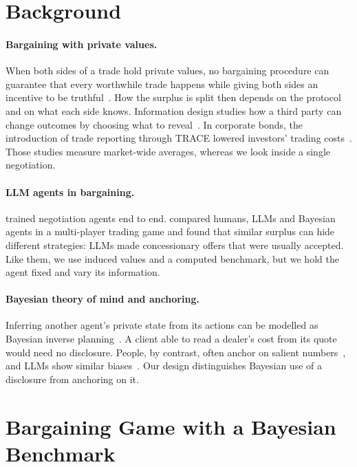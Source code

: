 \documentclass[sigconf]{acmart}
\begin{document}
\section{Background}

\paragraph{Bargaining with private values.}
When both sides of a trade hold private values, no bargaining procedure can guarantee that every worthwhile trade happens while giving both sides an incentive to be truthful~\cite{myerson1983efficient}. How the surplus is split then depends on the protocol and on what each side knows. Information design studies how a third party can change outcomes by choosing what to reveal~\cite{kamenica2011bayesian}. In corporate bonds, the introduction of trade reporting through TRACE lowered investors' trading costs~\cite{bessembinder2006market,edwards2007corporate}. Those studies measure market-wide averages, whereas we look inside a single negotiation.

\paragraph{LLM agents in bargaining.}
\citet{lewis2017deal} trained negotiation agents end to end. \citet{qian2026strategic} compared humans, LLMs and Bayesian agents in a multi-player trading game and found that similar surplus can hide different strategies: LLMs made concessionary offers that were usually accepted. Like them, we use induced values and a computed benchmark, but we hold the agent fixed and vary its information.

\paragraph{Bayesian theory of mind and anchoring.}
Inferring another agent's private state from its actions can be modelled as Bayesian inverse planning~\cite{baker2017rational,zhixuan2020online}. A client able to read a dealer's cost from its quote would need no disclosure. People, by contrast, often anchor on salient numbers~\cite{tversky1974judgment}, and LLMs show similar biases~\cite{jones2022capturing}. Our design distinguishes Bayesian use of a disclosure from anchoring on it.

\section{Bargaining Game with a Bayesian Benchmark}
\end{document}
